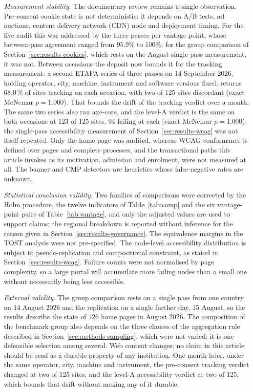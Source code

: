 \documentclass[pdflatex,sn-basic,Numbered,iicol]{sn-jnl}
\theoremstyle{thmstyleone}
\theoremstyle{thmstyletwo}
\theoremstyle{thmstylethree}
\begin{document}
\emph{Measurement stability.} The documentary review remains a single observation. Pre-consent cookie state is not deterministic: it depends on A/B tests, ad auctions, content delivery network (CDN) node and deployment timing. For the live audit this was addressed by the three passes per vantage point, whose between-pass agreement ranged from 95.9\% to 100\%; for the group comparison of Section~\ref{sec:results-cookies}, which rests on the August single-pass measurement, it was not. Between occasions the deposit now bounds it for the tracking measurement: a second ETAPA series of three passes on 14 September 2026, holding operator, city, machine, instrument and software versions fixed, returns 68.0\,\% of sites tracking on each occasion, with two of 125 sites discordant (exact McNemar $p=1.000$). That bounds the drift of the tracking verdict over a month. The same two series also ran axe-core, and the level-A verdict is the same on both occasions at 123 of 125 sites, 94 failing at each (exact McNemar $p=1.000$); the single-pass accessibility measurement of Section~\ref{sec:results-wcag} was not itself repeated. Only the home page was audited, whereas WCAG conformance is defined over pages and complete processes, and the transactional paths this article invokes as its motivation, admission and enrolment, were not measured at all. The banner and CMP detectors are heuristics whose false-negative rates are unknown.

\emph{Statistical conclusion validity.} Two families of comparisons were corrected by the Holm procedure, the twelve indicators of Table~\ref{tab:comp} and the six vantage-point pairs of Table~\ref{tab:vantage}, and only the adjusted values are used to support claims; the regional breakdown is reported without inference for the reason given in Section~\ref{sec:results-governance}. The equivalence margins in the TOST analysis were not pre-specified. The node-level accessibility distribution is subject to pseudo-replication and compositional constraint, as stated in Section~\ref{sec:results-wcag}. Failure counts were not normalised by page complexity, so a large portal will accumulate more failing nodes than a small one without necessarily being less accessible.

\emph{External validity.} The group comparison rests on a single pass from one country on 14 August 2026 and the replication on a single further day, 15 August, so the results describe the state of 126 home pages in August 2026. The composition of the benchmark group also depends on the three choices of the aggregation rule described in Section~\ref{sec:methods-sampling}, which were not varied; it is one defensible selection among several. Web content changes; no claim in this article should be read as a durable property of any institution. One month later, under the same operator, city, machine and instrument, the pre-consent tracking verdict changed at two of 125 sites, and the level-A accessibility verdict at two of 125, which bounds that drift without making any of it durable.
\end{document}
